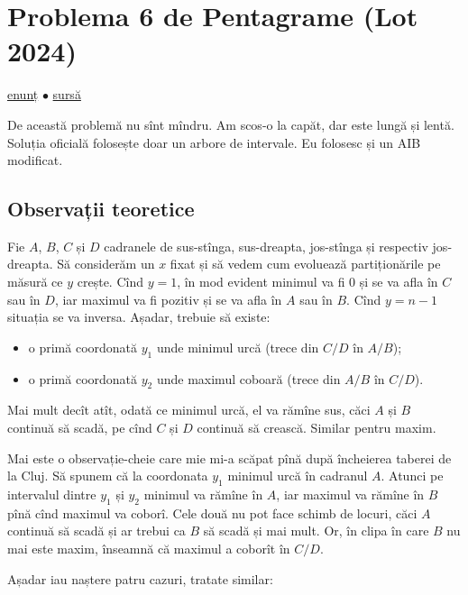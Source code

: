 \section{Problema 6 de Pentagrame (Lot 2024)}
\label{problem:6-de-pentagrame}

\href{https://kilonova.ro/problems/2801}{enunț}
$\bullet$
\hyperref[code:6-de-pentagrame]{sursă}

De această problemă nu sînt mîndru. Am scos-o la capăt, dar este lungă și lentă. Soluția oficială folosește doar un arbore de intervale. Eu folosesc și un AIB modificat.

\subsection{Observații teoretice}

Fie $A$, $B$, $C$ și $D$ cadranele de sus-stînga, sus-dreapta, jos-stînga și respectiv jos-dreapta. Să considerăm un $x$ fixat și să vedem cum evoluează partiționările pe măsură ce $y$ crește. Cînd $y = 1$, în mod evident minimul va fi 0 și se va afla în $C$ sau în $D$, iar maximul va fi pozitiv și se va afla în $A$ sau în $B$. Cînd $y = n - 1$ situația se va inversa. Așadar, trebuie să existe:

\begin{itemize}
  \item o primă coordonată $y_1$ unde minimul urcă (trece din $C/D$ în $A/B$);
  \item o primă coordonată $y_2$ unde maximul coboară (trece din $A/B$ în $C/D$).
\end{itemize}

Mai mult decît atît, odată ce minimul urcă, el va rămîne sus, căci $A$ și $B$ continuă să scadă, pe cînd $C$ și $D$ continuă să crească. Similar pentru maxim.

Mai este o observație-cheie care mie mi-a scăpat pînă după încheierea taberei de la Cluj.  Să spunem că la coordonata $y_1$ minimul urcă în cadranul $A$. Atunci pe intervalul dintre $y_1$ și $y_2$ minimul va rămîne în $A$, iar maximul va rămîne în $B$ pînă cînd maximul va coborî. Cele două nu pot face schimb de locuri, căci $A$ continuă să scadă și ar trebui ca $B$ să scadă și mai mult. Or, în clipa în care $B$ nu mai este maxim, înseamnă că maximul a coborît în $C/D$.

Așadar iau naștere patru cazuri, tratate similar:

